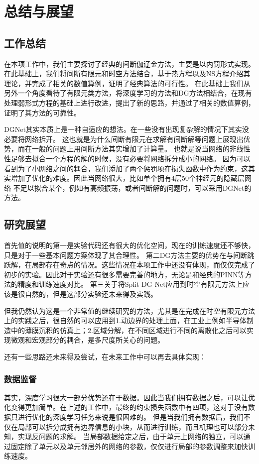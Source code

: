 \chapter{总结与展望}
\section{工作总结}
在本项工作中，我们主要探讨了经典的间断伽辽金方法，主要是以内罚形式实现。在此基础上，我们将间断有限元和时空方法结合，基于热方程以及NS方程介绍其理论，并完成了相关的数值算例，证明了经典算法的可行性。
在此基础上我们从另外一个角度看待了有限元类方法，将深度学习的方法和DG方法相结合，在现有处理弱形式方程的基础上进行改进，提出了新的思路，并通过了相关的数值算例，证明了其方法的可靠性。

DGNet其实本质上是一种自适应的想法。在一些没有出现复杂解的情况下其实没必要将网络拆开。
这也就是为什么间断有限元在求解有间断解等问题上展现出优势，而在一般的问题上用间断方法其实增加了计算量。
也就是说当网络的非线性性足够去拟合一个方程的解的时候，没有必要将网络拆分成小的网络。
因为可以看到为了小网络之间的耦合，我们添加了两个惩罚项在损失函数中作为约束，这其实增加了优化的难度。因此当网络很大，比如单个拥有4层50个神经元的隐藏层网络
不足以拟合某个，例如有高频振荡，或者间断解的问题时，可以采用DGNet的方法。    
\section{研究展望}
首先值的说明的第一是实验代码还有很大的优化空间，现在的训练速度还不够快，只是对于一些基本问题方案体现了其合理性。
第二DG方法主要的优势在与间断跳跃解，在局部存在奇点的情况。这些情况在本项工作中还没有体现，而仅仅完成了初步的实验。因此对于实验还有很多需要完善的地方，无论是和经典的PINN等方法的精度和训练速度对比。
第三关于将Split DG Net应用到时空有限元方法上应该是很自然的，但是这部分实验还未来得及实践。

但我仍然认为这是一个非常值的继续研究的方法，尤其是在完成在时空有限元方法上的实践之后，很自然的可以应用到1.动边界的处理上面，在工业上例如半导体制造中的薄膜沉积的仿真上；2.区域分解，在不同区域进行不同的离散化之后可以实现微观和宏观部分的耦合，是多尺度所关心的问题。

还有一些思路还未来得及尝试，在未来工作中可以再去具体实现：
\subsection*{数据监督}
其实，深度学习很大一部分优势还在于数据。因此当我们拥有数据之后，可以让优化变得更加简单。在上述的工作中，最终的约束损失函数中有四项，这对于没有数据只进行优化的深度学习任务来说是很困难的。
但是当我们拥有数据后，我们不仅在局部可以拆分成拥有边界信息的小块，从而进行训练，而且机理也可以部分未知，实现反问题的求解。
当局部数据给定之后，由于单元上网络的独立，可以通过固定除了单元以及单元邻居外的网络的参数，仅仅进行局部的参数调整来加快训练速度。

